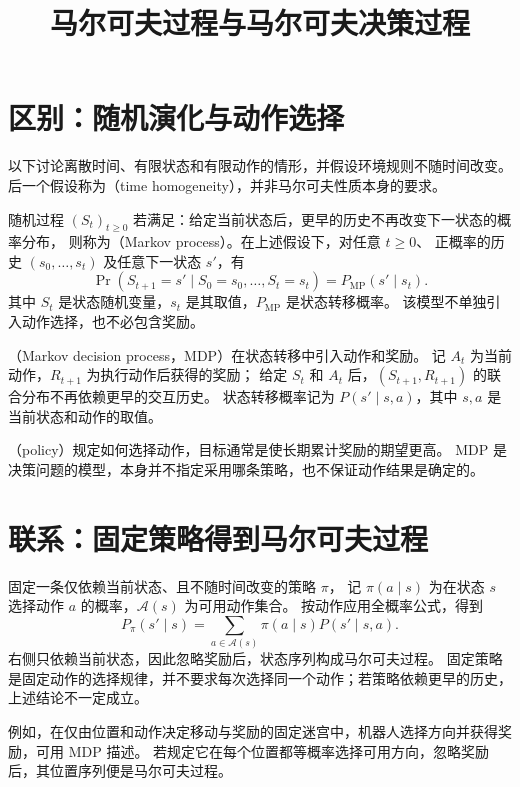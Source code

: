 \documentclass[UTF8]{ctexart}
\title{马尔可夫过程与马尔可夫决策过程}
\author{}
\date{}
\begin{document}
\maketitle

\section{区别：随机演化与动作选择}
\label{sec:mp-mdp-distinction}

以下讨论离散时间、有限状态和有限动作的情形，并假设环境规则不随时间改变。
后一个假设称为（time homogeneity），并非马尔可夫性质本身的要求。

\begin{definition}[马尔可夫过程]
随机过程 $(S_t)_{t\geq0}$ 若满足：给定当前状态后，更早的历史不再改变下一状态的概率分布，
则称为（Markov process）。在上述假设下，对任意 $t\geq0$、
正概率的历史 $(s_0,\ldots,s_t)$ 及任意下一状态 $s'$，有
\begin{equation}
  \Pr(S_{t+1}=s'\mid S_0=s_0,\ldots,S_t=s_t)
  =P_{\mathrm{MP}}(s'\mid s_t).
  \label{eq:mp-mdp-markov}
\end{equation}
其中 $S_t$ 是状态随机变量，$s_t$ 是其取值，$P_{\mathrm{MP}}$ 是状态转移概率。
该模型不单独引入动作选择，也不必包含奖励。
\end{definition}

\begin{definition}[马尔可夫决策过程]
（Markov decision process，MDP）在状态转移中引入动作和奖励。
记 $A_t$ 为当前动作，$R_{t+1}$ 为执行动作后获得的奖励；
给定 $S_t$ 和 $A_t$ 后，$(S_{t+1},R_{t+1})$ 的联合分布不再依赖更早的交互历史。
状态转移概率记为 $P(s'\mid s,a)$，其中 $s,a$ 是当前状态和动作的取值。
\end{definition}

（policy）规定如何选择动作，目标通常是使长期累计奖励的期望更高。
MDP 是决策问题的模型，本身并不指定采用哪条策略，也不保证动作结果是确定的。

\section{联系：固定策略得到马尔可夫过程}
\label{sec:mp-mdp-fixed-policy}

固定一条仅依赖当前状态、且不随时间改变的策略 $\pi$，
记 $\pi(a\mid s)$ 为在状态 $s$ 选择动作 $a$ 的概率，$\mathcal A(s)$ 为可用动作集合。
按动作应用全概率公式，得到
\begin{equation}
  P_\pi(s'\mid s)
  =\sum_{a\in\mathcal A(s)}\pi(a\mid s)P(s'\mid s,a).
  \label{eq:mp-mdp-induced-transition}
\end{equation}
右侧只依赖当前状态，因此忽略奖励后，状态序列构成马尔可夫过程。
固定策略是固定动作的选择规律，并不要求每次选择同一个动作；若策略依赖更早的历史，上述结论不一定成立。

例如，在仅由位置和动作决定移动与奖励的固定迷宫中，机器人选择方向并获得奖励，可用 MDP 描述。
若规定它在每个位置都等概率选择可用方向，忽略奖励后，其位置序列便是马尔可夫过程。
\end{document}
